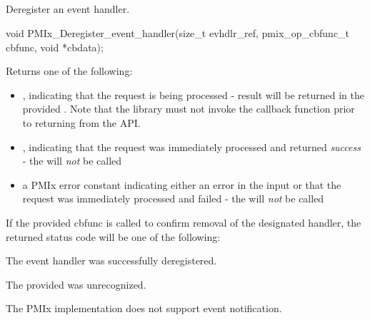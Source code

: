 \subsection{}

\summary

Deregister an event handler.

\format

\cspecificstart
\begin{codepar}
void
PMIx_Deregister_event_handler(size_t evhdlr_ref,
                              pmix_op_cbfunc_t cbfunc,
                              void *cbdata);
\end{codepar}
\cspecificend

\begin{arglist}
\end{arglist}

Returns one of the following:
\begin{itemize}
\item {}, indicating that the request is being processed - result will be returned in the provided . Note that the library must not invoke the callback function prior to returning from the \ac{API}.
\item {}, indicating that the request was immediately processed and returned \textit{success} - the  will \textit{not} be called
\item a PMIx error constant indicating either an error in the input or that the request was immediately processed and failed - the  will \textit{not} be called
\end{itemize}

If the provided cbfunc is called to confirm removal of the designated handler, the returned status code will be one of the following:

\begin{constantdesc}
\item {} The event handler was successfully deregistered.
\item {} The provided  was unrecognized.
\item {} The \ac{PMIx} implementation does not support event notification.
\end{constantdesc}

